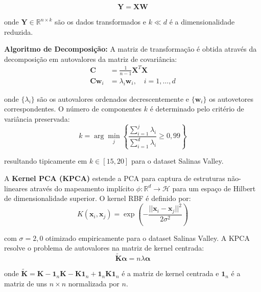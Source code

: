 \begin{equation}
\mathbf{Y} = \mathbf{X} \mathbf{W}
\label{eq:pca_projection}
\end{equation}

onde $\mathbf{Y} \in \mathbb{R}^{n \times k}$ são os dados transformados e 
$k \ll d$ é a dimensionalidade reduzida.

\textbf{Algoritmo de Decomposição:} A matriz de transformação é obtida através 
da decomposição em autovalores da matriz de covariância:
\begin{align}
\mathbf{C} &= \frac{1}{n-1} \mathbf{X}^T \mathbf{X} \label{eq:covariance_matrix} \\
\mathbf{C} \mathbf{w}_i &= \lambda_i \mathbf{w}_i, \quad i = 1,\ldots,d \label{eq:eigenvalue_decomposition}
\end{align}

onde $\{\lambda_i\}$ são os autovalores ordenados decrescentemente e $\{\mathbf{w}_i\}$ 
os autovetores correspondentes. O número de componentes $k$ é determinado pelo 
critério de variância preservada:
\begin{equation}
k = \arg\min_j \left\{ \frac{\sum_{i=1}^{j} \lambda_i}{\sum_{i=1}^{d} \lambda_i} \geq 0{,}99 \right\}
\label{eq:pca_components_selection}
\end{equation}

resultando tipicamente em $k \in [15, 20]$ para o dataset Salinas Valley.

A \textbf{Kernel PCA (KPCA)} estende a PCA para captura de estruturas não-lineares 
através do mapeamento implícito $\phi: \mathbb{R}^d \rightarrow \mathcal{H}$ 
para um espaço de Hilbert de dimensionalidade superior. O kernel RBF é definido por:
\begin{equation}
K(\mathbf{x}_i, \mathbf{x}_j) = \exp\left(-\frac{||\mathbf{x}_i - \mathbf{x}_j||^2}{2\sigma^2}\right)
\label{eq:rbf_kernel_kpca}
\end{equation}

com $\sigma = 2{,}0$ otimizado empiricamente para o dataset Salinas Valley. 
A KPCA resolve o problema de autovalores na matriz de kernel centrada:
\begin{equation}
\tilde{\mathbf{K}} \boldsymbol{\alpha} = n\lambda \boldsymbol{\alpha}
\label{eq:kpca_eigenvalue}
\end{equation}

onde $\tilde{\mathbf{K}} = \mathbf{K} - \mathbf{1}_n \mathbf{K} - \mathbf{K} \mathbf{1}_n + \mathbf{1}_n \mathbf{K} \mathbf{1}_n$ 
é a matriz de kernel centrada e $\mathbf{1}_n$ é a matriz de uns $n \times n$ 
normalizada por $n$.

